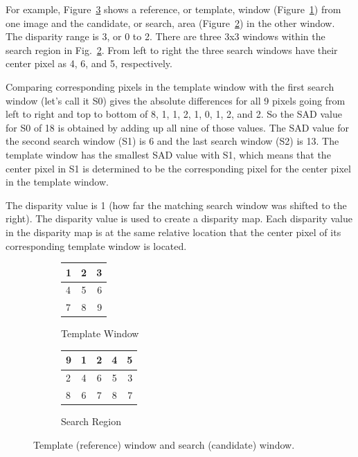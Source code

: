 For example, Figure~\ref{fig:windows} shows a reference, or template, window (Figure~\ref{fig:template}) from one image and the candidate, or search, area (Figure~\ref{fig:search}) in the other window. The disparity range is 3, or 0 to 2. There are three 3x3 windows within the search region in Fig.~\ref{fig:search}. From left to right the three search windows have their center pixel as 4, 6, and 5, respectively. 

Comparing corresponding pixels in the template window with the first search window (let's call it S0) gives the absolute differences for all 9 pixels going from left to right and top to bottom of 8, 1, 1, 2, 1, 0, 1, 2, and 2. So the SAD value for S0 of 18 is obtained by adding up all nine of those values. The SAD value for the second search window (S1) is 6 and the last search window (S2) is 13. The template window has the smallest SAD value with S1, which means that the center pixel in S1 is determined to be the corresponding pixel for the center pixel in the template window. 

The disparity value is 1 (how far the matching search window was shifted to the right). The disparity value is used to create a disparity map. Each disparity value in the disparity map is at the same relative location that the center pixel of its corresponding template window is located.

\begin{figure}
\begin{center}
	\begin{subfigure}{0.3\textwidth}
		\begin{center}				
			\begin{tabular}{|l|c|r|}
				\hline
				1 & 2 & 3 \\\hline
	  			4 & 5 & 6 \\\hline
		    	7 & 8 & 9 \\
		    	\hline
			\end{tabular}
		\end{center}
		\caption{Template Window}
		\label{fig:template}
	\end{subfigure}
	\begin{subfigure}{0.3\textwidth}
		\begin{center}		
			\begin{tabular}{|l|c|c|c|r|}
				\hline
				9 & 1 & 2 & 4 & 5 \\\hline
		  		2 & 4 & 6 & 5 & 3 \\\hline
		    	8 & 6 & 7 & 8 & 7 \\
		    	\hline
			\end{tabular}
		\end{center}
		\caption{Search Region}
		\label{fig:search}
	\end{subfigure}
	\captionfonts
	\caption{Template (reference) window and search (candidate) window.}
	\label{fig:windows}
\end{center}
\end{figure}
